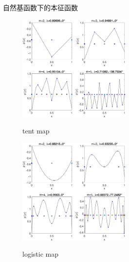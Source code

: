 \documentclass{beamer}
\begin{document}
      \begin{frame}{自然基函数下的本征函数}
      	\begin{figure}
      		\begin{minipage}{0.45\linewidth}
      			\centerline{\includegraphics[width=2.2in]{images/04a-Tent_eigen_natural_n1000_m2-3-4-5.eps}}
      			\centerline{tent map}
      		\end{minipage}
      		\hfill
      		\begin{minipage}{0.45\linewidth}
      			\centerline{\includegraphics[width=2.2in]{images/04b-Logistic_eigen_natural_n1000_m2-3-4-5.eps}}
      			\centerline{logistic map}
      		\end{minipage}
      	\end{figure}
      \end{frame}
\end{document}
